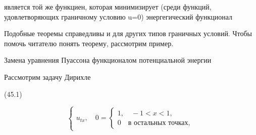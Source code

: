 \documentclass[
  ukrainian,
]{article}
\begin{document}
является той же функциен, которая минимизирует (среди функций,
удовлетворяющих граничному условию u=0) энергегический функционал

Подобные теоремы справедливы и для других типов граничных условий. Чтобы
помочь читателю понять теорему, рассмотрим пример.

Замена уравнения Пуассона функционалом потенциальной энергии

Рассмотрим задачу Дирихле

(45.1)

\[
\begin{cases} u_{tx}, \quad 0 = \begin{cases} 1, \quad -1 < x < 1, \\ 0 \quad \text{в остальных точках,} \end{cases} \end{cases}
\]
\end{document}
